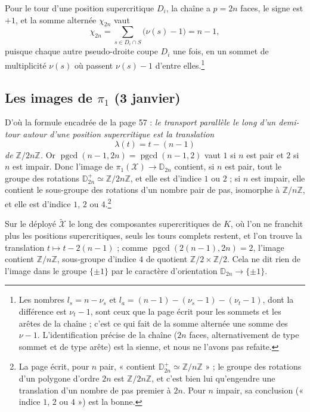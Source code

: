 \documentclass[11pt,a4paper]{article}
\begin{document}
Pour le tour d'une position supercritique $D_i$, la chaîne a $p = 2n$ faces, le
signe est $+1$, et la somme alternée $\chi_{2n}$ vaut
\[
\chi_{2n} = \sum_{s \in D_i \cap S} \bigl( \nu(s) - 1 \bigr) = n - 1 ,
\]
puisque chaque autre pseudo-droite coupe $D_i$ une fois, en un sommet de
multiplicité $\nu(s)$ où passent $\nu(s) - 1$ d'entre elles.\footnote{Les
nombres $l_s = n - \nu_s$ et $l_a = (n - 1) - (\nu_s - 1) - (\nu_t - 1)$, dont la
différence est $\nu_t - 1$, sont ceux que la page écrit pour les sommets et les
arêtes de la chaîne ; c'est ce qui fait de la somme alternée une somme des
$\nu - 1$. L'identification précise de la chaîne ($2n$ faces, alternativement
de type sommet et de type arête) est la sienne, et nous ne l'avons pas refaite.}

\subsection*{Les images de $\pi_1$ (3 janvier)}

D'où la formule encadrée de la page 57 : \emph{le transport parallèle le long
d'un demi-tour autour d'une position supercritique est la translation}
\[
\lambda(t) = t - (n - 1)
\]
\emph{de $\mathbb{Z}/2n\mathbb{Z}$.} Or $\operatorname{pgcd}(n - 1, 2n) =
\operatorname{pgcd}(n - 1, 2)$ vaut $1$ si $n$ est pair et $2$ si $n$ est
impair. Donc l'image de $\pi_1(\mathcal{X}) \to \mathbb{D}_{2n}$ contient, si
$n$ est pair, tout le groupe des rotations $\mathbb{D}^{+}_{2n} \simeq
\mathbb{Z}/2n\mathbb{Z}$, et elle est d'indice $1$ ou $2$ ; si $n$ est impair,
elle contient le sous-groupe des rotations d'un nombre pair de pas, isomorphe à
$\mathbb{Z}/n\mathbb{Z}$, et elle est d'indice $1$, $2$ ou $4$.\footnote{La page
écrit, pour $n$ pair, « contient $\mathbb{D}^{+}_{2n} \simeq
\mathbb{Z}/n\mathbb{Z}$ » ; le groupe des rotations d'un polygone d'ordre $2n$
est $\mathbb{Z}/2n\mathbb{Z}$, et c'est bien lui qu'engendre une translation
d'un nombre de pas premier à $2n$. Pour $n$ impair, sa conclusion (« indice
$1$, $2$ ou $4$ ») est la bonne.}

Sur le déployé $\widetilde{\mathcal{X}}$ le long des composantes supercritiques
de $K$, où l'on ne franchit plus les positions supercritiques, seuls les tours
complets restent, et l'on trouve la translation $t \mapsto t - 2(n - 1)$ ;
comme $\operatorname{pgcd}(2(n-1), 2n) = 2$, l'image contient
$\mathbb{Z}/n\mathbb{Z}$, sous-groupe d'indice $4$ de quotient
$\mathbb{Z}/2 \times \mathbb{Z}/2$. Cela ne dit rien de l'image dans le groupe
$\lbrace \pm 1 \rbrace$ par le caractère d'orientation $\mathbb{D}_{2n} \to
\lbrace \pm 1 \rbrace$.
\end{document}
